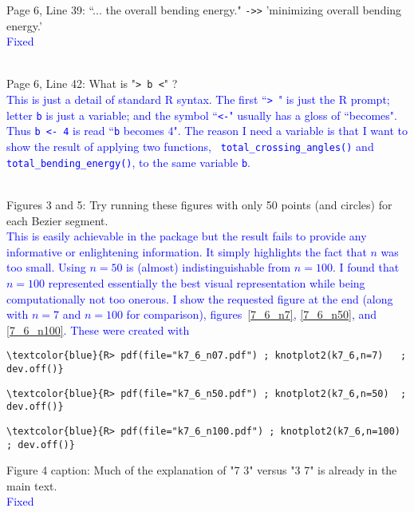 \documentclass[12pt]{article}
\begin{document}
Page 6, Line 39: ``... the overall bending energy." {\tt ->>} 'minimizing
overall bending energy.'
\textcolor{blue}{\\Fixed\\ \\}

Page 6, Line 42: What is "{\tt > b <}" ?  \textcolor{blue}{\\ This is
  just a detail of standard R syntax.  The first ``{\tt > }" is just
  the R prompt; letter {\tt b} is just a variable; and the symbol
  ``{\tt <-}" usually has a gloss of ``becomes".  Thus {\tt b <- 4} is
  read ``{\tt b} becomes 4". The reason I need a variable is that I
  want to show the result of applying two functions, {\tt
    total\_crossing\_angles()} and {\tt total\_bending\_energy()}, to
  the same variable {\tt b}.\\ \\}


Figures 3 and 5: Try running these figures with only 50 points (and
circles) for each Bezier segment. \textcolor{blue}{\\This is easily
  achievable in the package but the result fails to provide any
  informative or enlightening information.  It simply highlights the
  fact that $n$ was too small.  Using $n=50$ is (almost)
  indistinguishable from $n=100$.  I found that $n=100$ represented
  essentially the best visual representation while being
  computationally not too onerous.  I show the requested figure at the
  end (along with $n=7$ and $n=100$ for comparison),
  figures~\ref{7_6_n7}, \ref{7_6_n50}, and \ref{7_6_n100}.  These were
  created with}

\begin{Verbatim}[commandchars=\\\{\}]
\textcolor{blue}{R> pdf(file="k7_6_n07.pdf") ; knotplot2(k7_6,n=7)   ; dev.off()}
\end{Verbatim}
\begin{Verbatim}[commandchars=\\\{\}]
\textcolor{blue}{R> pdf(file="k7_6_n50.pdf") ; knotplot2(k7_6,n=50)  ; dev.off()}
\end{Verbatim}
\begin{Verbatim}[commandchars=\\\{\}]
\textcolor{blue}{R> pdf(file="k7_6_n100.pdf") ; knotplot2(k7_6,n=100) ; dev.off()}
\end{Verbatim}


Figure 4 caption: Much of the explanation of "7 3" versus "3 7" is
already in the main text.  \textcolor{blue}{\\Fixed\\ \\}
\end{document}
